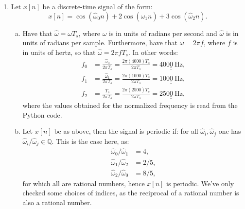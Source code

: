 \begin{enumerate}
  \item Let $x[n]$ be a discrete-time signal of the form:
        \[ x[n]=\cos(\hat{\omega}_0 n)+2\cos(\hat{\omega}_1 n)+3\cos(\hat{\omega}_2 n). \]

        \begin{enumerate}[a)]
          \item Have that $\hat{\omega}=\omega T_{s}$, where $\omega$ is in units of radians per 
                second and $\hat{\omega}$ is in units of radians per sample. Furthermore, 
                have that $\omega=2\pi f$, where $f$ is in units of hertz, so 
                that $\hat{\omega}=2\pi f T_{s}$. In other words:
                \begin{align*}
                  f_{0} & = \frac{\hat{\omega}_{0}}{2\pi T_{s}}=\frac{2\pi (4000)T_{s}}{2\pi T_{s}}=\underline{\underline{4000\ \mathrm{Hz}}}, \\
                  f_{1} & = \frac{\hat{\omega}_{1}}{2\pi T_{s}}=\frac{2\pi (1000)T_{s}}{2\pi T_{s}}=\underline{\underline{1000\ \mathrm{Hz}}}, \\
                  f_{2} & = \frac{T_{s}}{2\pi T_{s}}=\frac{2\pi (2500)T_{s}}{2\pi T_{s}}=\underline{\underline{2500\  \mathrm{Hz}}},
                \end{align*}
                where the values obtained for the normalized frequency is read from the Python code.

          \item Let $x[n]$ be as above, then the signal is periodic if: for all $\hat{\omega}_{i}, \hat{\omega}_{j}$ 
                one has $\hat{\omega}_{i}/\hat{\omega}_{j}\in\mathbb{Q}$. This is the case here, as:
                \begin{align*}
                  \hat{\omega}_{0}/\hat{\omega}_{1} & = 4,   \\
                  \hat{\omega}_{1}/\hat{\omega}_{2} & = 2/5, \\
                  \hat{\omega}_{2}/\hat{\omega}_{0} & = 8/5,
                \end{align*}
                for which all are rational numbers, hence $x[n]$ is periodic.
                We've only checked some choices of indices, as the reciprocal of a rational 
                number is also a rational number.


\end{enumerate}
\end{enumerate}
